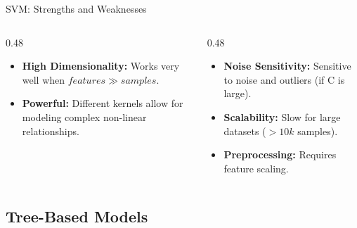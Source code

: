 

\begin{frame}{SVM: Strengths and Weaknesses}
    \begin{columns}[T]
        \begin{column}{0.48\textwidth}
            \begin{tcolorbox}[colback=green!5, title=\textbf{Advantages}]
                \small
                \begin{itemize}
                    \item \textbf{High Dimensionality:} Works very well when $features \gg samples$.
                    \item \textbf{Powerful:} Different kernels allow for modeling complex non-linear relationships.
                \end{itemize}
            \end{tcolorbox}
        \end{column}
        \begin{column}{0.48\textwidth}
            \begin{tcolorbox}[colback=red!5, title=\textbf{Disadvantages}]
                \small
                \begin{itemize}
                    \item \textbf{Noise Sensitivity:} Sensitive to noise and outliers (if C is large).
                    \item \textbf{Scalability:} Slow for large datasets ($>10k$ samples).
                    \item \textbf{Preprocessing:} Requires feature scaling.
                \end{itemize}
            \end{tcolorbox}
        \end{column}
    \end{columns}
\end{frame}



\subsection{Tree-Based Models}

